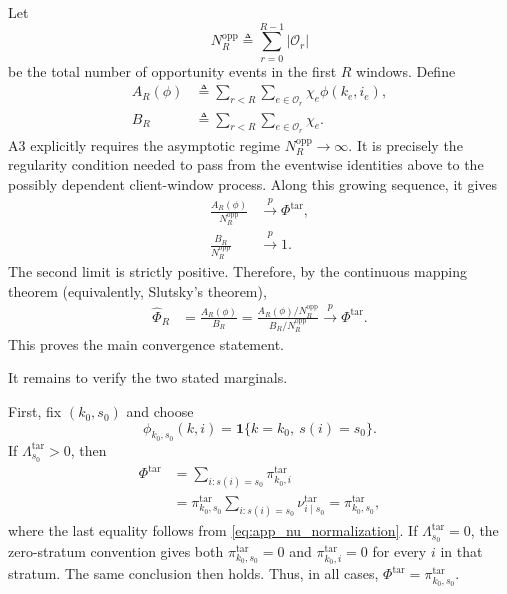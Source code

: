 Let
\begin{equation}
    N_R^{\mathrm{opp}}
    \triangleq
    \sum_{r=0}^{R-1}|\mathcal{O}_r|
    \label{eq:app_total_opp_events}
\end{equation}
be the total number of opportunity events in the first $R$ windows.  Define
\begin{align}
 A_R(\phi)
 &\triangleq
 \sum_{r<R}
 \sum_{e\in\mathcal{O}_r}
 \chi_e\phi(k_e,i_e),
 \label{eq:app_AR}\\
 B_R
 &\triangleq
 \sum_{r<R}
 \sum_{e\in\mathcal{O}_r}
 \chi_e.
 \label{eq:app_BR}
\end{align}
A3 explicitly requires the asymptotic regime
$N_R^{\mathrm{opp}}\rightarrow\infty$.  It is precisely the regularity
condition needed to pass from the eventwise identities above to the possibly
dependent client-window process.  Along this growing sequence, it gives
\begin{align}
 \frac{A_R(\phi)}{N_R^{\mathrm{opp}}}
 &\xrightarrow{p}
 \Phi^{\mathrm{tar}},
 \label{eq:app_AR_lln}\\
 \frac{B_R}{N_R^{\mathrm{opp}}}
 &\xrightarrow{p}
 1.
 \label{eq:app_BR_lln}
\end{align}
The second limit is strictly positive.  Therefore, by the continuous mapping
theorem (equivalently, Slutsky's theorem),
\begin{align}
 \widehat\Phi_R
 &=
 \frac{A_R(\phi)}{B_R}
 =
 \frac{
 A_R(\phi)/N_R^{\mathrm{opp}}
 }{
 B_R/N_R^{\mathrm{opp}}
 }
 \xrightarrow{p}
 \Phi^{\mathrm{tar}}.
 \label{eq:app_hajek_limit}
\end{align}
This proves the main convergence statement.

It remains to verify the two stated marginals.

First, fix $(k_0,s_0)$ and choose
\begin{equation}
    \phi_{k_0,s_0}(k,i)
    =
    \mathbf{1}\{k=k_0,\ s(i)=s_0\}.
    \label{eq:app_phi_client_stratum}
\end{equation}
If $\Lambda_{s_0}^{\mathrm{tar}}>0$, then
\begin{align}
 \Phi^{\mathrm{tar}}
 &=
 \sum_{i:s(i)=s_0}
 \pi^{\mathrm{tar}}_{k_0,i}
 \nonumber\\
 &=
 \pi^{\mathrm{tar}}_{k_0,s_0}
 \sum_{i:s(i)=s_0}
 \nu^{\mathrm{tar}}_{i\mid s_0}
 =
 \pi^{\mathrm{tar}}_{k_0,s_0},
 \label{eq:app_recover_client_stratum_positive}
\end{align}
where the last equality follows from
\eqref{eq:app_nu_normalization}.  If
$\Lambda_{s_0}^{\mathrm{tar}}=0$, the zero-stratum convention gives both
$\pi^{\mathrm{tar}}_{k_0,s_0}=0$ and
$\pi^{\mathrm{tar}}_{k_0,i}=0$ for every $i$ in that stratum.  The same
conclusion then holds.  Thus, in all cases,
$\Phi^{\mathrm{tar}}=\pi^{\mathrm{tar}}_{k_0,s_0}$.

